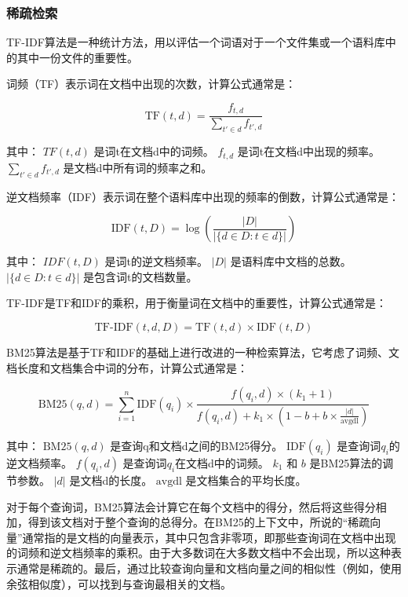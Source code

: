 \subsubsection{稀疏检索}
TF-IDF算法是一种统计方法，用以评估一个词语对于一个文件集或一个语料库中的其中一份文件的重要性。

词频（TF）表示词在文档中出现的次数，计算公式通常是：

\begin{equation}
\text{TF}(t,d) = \frac{f_{t,d}}{\sum_{t' \in d} f_{t',d}}
\end{equation}

其中： 
$TF(t,d)$ 是词t在文档d中的词频。
$f_{t,d}$ 是词t在文档d中出现的频率。
$\sum_{t' \in d} f_{t',d}$ 是文档d中所有词的频率之和。

逆文档频率（IDF）表示词在整个语料库中出现的频率的倒数，计算公式通常是：

\begin{equation}
\text{IDF}(t,D) = \log\left(\frac{|D|}{|\{d \in D : t \in d\}|}\right)
\end{equation}

其中：
$IDF(t,D)$ 是词t的逆文档频率。
$|D|$ 是语料库中文档的总数。
$|\{d \in D : t \in d\}|$ 是包含词t的文档数量。

TF-IDF是TF和IDF的乘积，用于衡量词在文档中的重要性，计算公式通常是：

\begin{equation}
\text{TF-IDF}(t,d,D) = \text{TF}(t,d) \times \text{IDF}(t,D)
\end{equation}

BM25算法是基于TF和IDF的基础上进行改进的一种检索算法，它考虑了词频、文档长度和文档集合中词的分布，计算公式通常是：

\begin{equation}
\text{BM25}(q,d) = \sum_{i=1}^{n} \text{IDF}(q_i) \times \frac{f(q_i, d) \times (k_1 + 1)}{f(q_i, d) + k_1 \times (1 - b + b \times \frac{|d|}{\text{avgdl}})}
\end{equation}

其中：
$\text{BM25}(q,d)$ 是查询q和文档d之间的BM25得分。
$\text{IDF}(q_i)$ 是查询词$q_i$的逆文档频率。
$f(q_i, d)$ 是查询词$q_i$在文档d中的词频。
$k_1$ 和 $b$ 是BM25算法的调节参数。
$|d|$ 是文档d的长度。
$\text{avgdl}$ 是文档集合的平均长度。

对于每个查询词，BM25算法会计算它在每个文档中的得分，然后将这些得分相加，得到该文档对于整个查询的总得分。在BM25的上下文中，所说的“稀疏向量”通常指的是文档的向量表示，其中只包含非零项，即那些查询词在文档中出现的词频和逆文档频率的乘积。由于大多数词在大多数文档中不会出现，所以这种表示通常是稀疏的。最后，通过比较查询向量和文档向量之间的相似性（例如，使用余弦相似度），可以找到与查询最相关的文档。

